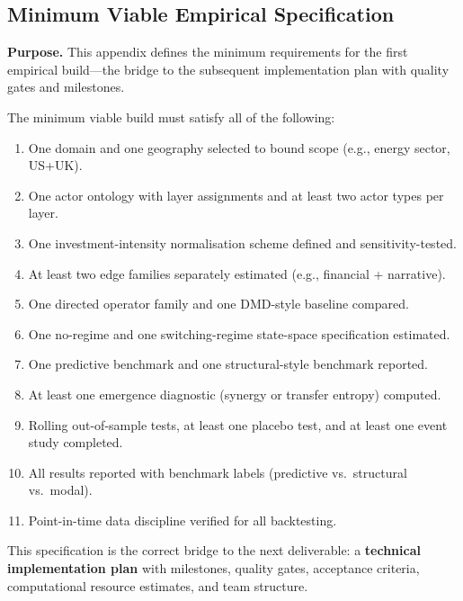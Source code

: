 \documentclass[11pt,a4paper]{article}
\theoremstyle{definition}
\begin{document}
\begin{appendices}
\section{Minimum Viable Empirical Specification}
\label{app:mve}

\textbf{Purpose.} This appendix defines the minimum requirements for the first empirical build---the bridge to the subsequent implementation plan with quality gates and milestones.

The minimum viable build must satisfy all of the following:
\begin{enumerate}[nosep]
  \item One domain and one geography selected to bound scope (e.g., energy sector, US+UK).
  \item One actor ontology with layer assignments and at least two actor types per layer.
  \item One investment-intensity normalisation scheme defined and sensitivity-tested.
  \item At least two edge families separately estimated (e.g., financial + narrative).
  \item One directed operator family and one DMD-style baseline compared.
  \item One no-regime and one switching-regime state-space specification estimated.
  \item One predictive benchmark and one structural-style benchmark reported.
  \item At least one emergence diagnostic (synergy or transfer entropy) computed.
  \item Rolling out-of-sample tests, at least one placebo test, and at least one event study completed.
  \item All results reported with benchmark labels (predictive vs.\ structural vs.\ modal).
  \item Point-in-time data discipline verified for all backtesting.
\end{enumerate}

This specification is the correct bridge to the next deliverable: a \textbf{technical implementation plan} with milestones, quality gates, acceptance criteria, computational resource estimates, and team structure.

\end{appendices}
\end{document}
